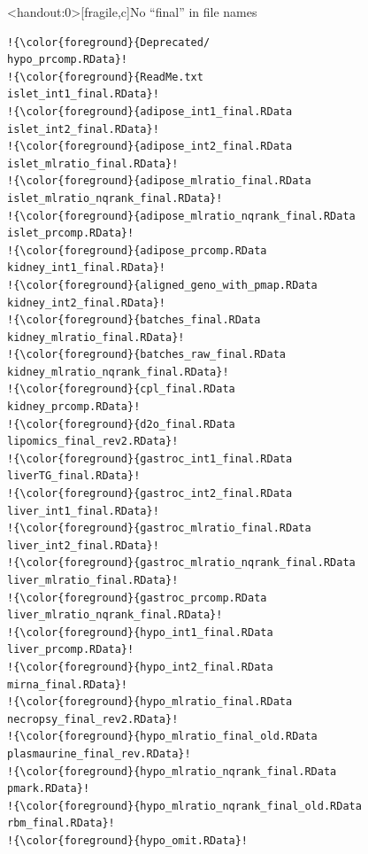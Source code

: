 \documentclass[aspectratio=169,12pt,t]{beamer}
\begin{document}
\begin{frame}<handout:0>[fragile,c]{No ``{\hilit final}'' in file names}


\addtocounter{framenumber}{-1}


\begin{center}
\begin{minipage}[c]{9.5cm}
\begin{semiverbatim}
\lstset{basicstyle=\tiny}
\begin{lstlisting}[escapechar=!,linewidth=9.5cm]
!{\color{foreground}{Deprecated/                            hypo_prcomp.RData}!
!{\color{foreground}{ReadMe.txt                             islet_int1_final.RData}!
!{\color{foreground}{adipose_int1_final.RData               islet_int2_final.RData}!
!{\color{foreground}{adipose_int2_final.RData               islet_mlratio_final.RData}!
!{\color{foreground}{adipose_mlratio_final.RData            islet_mlratio_nqrank_final.RData}!
!{\color{foreground}{adipose_mlratio_nqrank_final.RData     islet_prcomp.RData}!
!{\color{foreground}{adipose_prcomp.RData                   kidney_int1_final.RData}!
!{\color{foreground}{aligned_geno_with_pmap.RData           kidney_int2_final.RData}!
!{\color{foreground}{batches_final.RData                    kidney_mlratio_final.RData}!
!{\color{foreground}{batches_raw_final.RData                kidney_mlratio_nqrank_final.RData}!
!{\color{foreground}{cpl_final.RData                        kidney_prcomp.RData}!
!{\color{foreground}{d2o_final.RData                        lipomics_final_rev2.RData}!
!{\color{foreground}{gastroc_int1_final.RData               liverTG_final.RData}!
!{\color{foreground}{gastroc_int2_final.RData               liver_int1_final.RData}!
!{\color{foreground}{gastroc_mlratio_final.RData            liver_int2_final.RData}!
!{\color{foreground}{gastroc_mlratio_nqrank_final.RData     liver_mlratio_final.RData}!
!{\color{foreground}{gastroc_prcomp.RData                   liver_mlratio_nqrank_final.RData}!
!{\color{foreground}{hypo_int1_final.RData                  liver_prcomp.RData}!
!{\color{foreground}{hypo_int2_final.RData                  mirna_final.RData}!
!{\color{foreground}{hypo_mlratio_final.RData               necropsy_final_rev2.RData}!
!{\color{foreground}{hypo_mlratio_final_old.RData           plasmaurine_final_rev.RData}!
!{\color{foreground}{hypo_mlratio_nqrank_final.RData        pmark.RData}!
!{\color{foreground}{hypo_mlratio_nqrank_final_old.RData    rbm_final.RData}!
!{\color{foreground}{hypo_omit.RData}!
\end{lstlisting}
\end{semiverbatim}
\end{minipage}
\end{center}



\end{frame}
\end{document}
